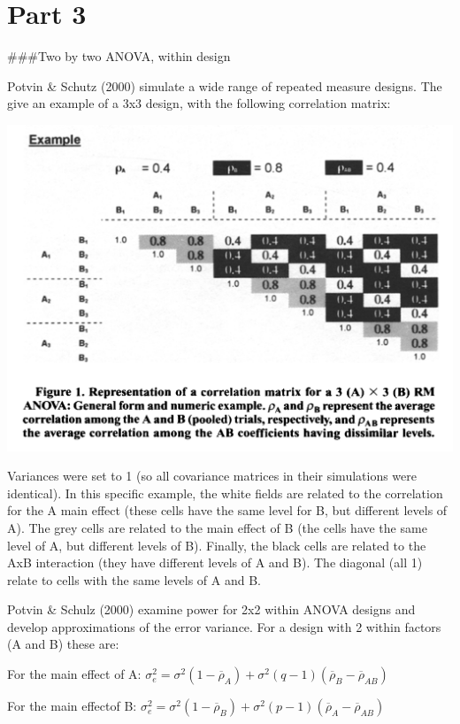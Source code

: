 \documentclass[]{book}
\begin{document}
\hypertarget{part-3-2}{%
\section{Part 3}\label{part-3-2}}

\#\#\#Two by two ANOVA, within design

Potvin \& Schutz (2000) simulate a wide range of repeated measure designs. The give an example of a 3x3 design, with the following correlation matrix:

\includegraphics{screenshots/PS2000.png}

Variances were set to 1 (so all covariance matrices in their simulations were identical). In this specific example, the white fields are related to the correlation for the A main effect (these cells have the same level for B, but different levels of A). The grey cells are related to the main effect of B (the cells have the same level of A, but different levels of B). Finally, the black cells are related to the AxB interaction (they have different levels of A and B). The diagonal (all 1) relate to cells with the same levels of A and B.

Potvin \& Schulz (2000) examine power for 2x2 within ANOVA designs and develop approximations of the error variance. For a design with 2 within factors (A and B) these are:

For the main effect of A:
\(\sigma _ { e } ^ { 2 } = \sigma ^ { 2 } ( 1 - \overline { \rho } _ { A } ) + \sigma ^ { 2 } ( q - 1 ) ( \overline { \rho } _ { B } - \overline { \rho } _ { AB } )\)

For the main effectof B:
\(\sigma _ { e } ^ { 2 } = \sigma ^ { 2 } ( 1 - \overline { \rho } _ { B } ) + \sigma ^ { 2 } ( p - 1 ) ( \overline { \rho } _ { A } - \overline { \rho } _ { A B } )\)
\end{document}
